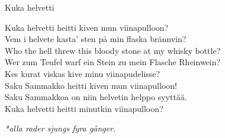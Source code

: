 \begin{song}{Kuka helvetti}
	
	\repetitionbegin{} Kuka helvetti heitti kiven mun viinapulloon? \repetitionend{}\\
	\repetitionbegin{} Vem i helvete kasta’ sten på min flaska brännvin? \repetitionend{} \\
	\repetitionbegin{} Who the hell threw this bloody stone at my whisky bottle? \repetitionend{}\\
	\repetitionbegin{} Wer zum Teufel warf ein Stein zu mein Flasche Rheinwein? \repetitionend{}\\
	\repetitionbegin{} Kes kurat viskas kive minu viinapudelisse? \repetitionend{}\\
	\repetitionbegin{} Saku Sammakko heitti kiven mun viinapulloon! \repetitionend{}\\
	\repetitionbegin{} Saku Sammakkoa on niin helvetin helppo syyttää. \repetitionend{}\\
	\repetitionbegin{} Kuka helvetti heitti minutkin viinapulloon? \repetitionend{}
	
	\emph{*alla rader sjungs fyra gånger.}
	
\end{song}

